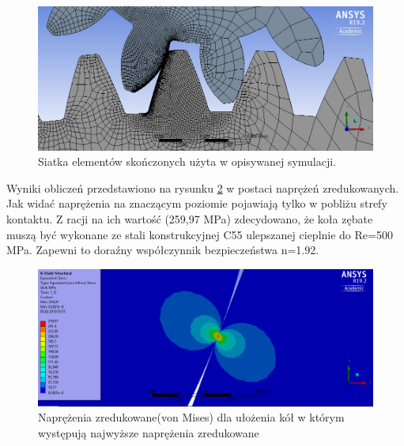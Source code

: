 \begin{figure}[bh]
	\centering
	\includegraphics[width=0.9\linewidth]{Obliczenia/siatka_przekladnia}
	\caption{Siatka elementów skończonych użyta w opisywanej symulacji.} 
	\label{fig::geometria_plus_BC_przekladnia}
\end{figure}

Wyniki obliczeń przedstawiono na rysunku \ref{fig::geometria_plus_BC_przekladnia} w postaci naprężeń zredukowanych.
Jak widać naprężenia na znaczącym poziomie pojawiają tylko w pobliżu strefy kontaktu.
Z racji na ich wartość (259,97 MPa) zdecydowano, że koła zębate muszą być wykonane ze stali konstrukcyjnej C55 ulepszanej cieplnie do Re=500 MPa.
Zapewni to doraźny współczynnik bezpieczeństwa n=1.92.

\begin{figure}[th]
	\centering
	\includegraphics[width=0.9\linewidth]{Obliczenia/von_mises_stress_przekladnia}
	\caption{Naprężenia zredukowane(von Mises) dla ułożenia kół w którym występują najwyższe naprężenia zredukowane} 
	\label{fig::geometria_plus_BC_przekladnia}
\end{figure}